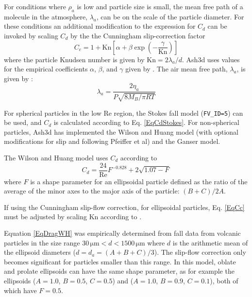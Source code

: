 For conditions where $\rho_a$
is low and particle size is small, the mean free path of a molecule in the
atmosphere, $\lambda_a$, can be on the scale of the particle diameter.  For these
conditions an additional modification to the expression for $C_d$ can
be invoked by scaling $C_d$ by the the Cunningham slip-correction factor
\begin{equation}
C_c = 1+\mathrm{Kn}\left[\alpha+\beta \exp{\left(-\frac{\gamma}{\mathrm{Kn}}\right)} \right]\label{EqCc}
\end{equation}
where the particle Knudsen number is given by $\mathrm{Kn}=2 \lambda_a / d$.
Ash3d uses values for the empirical coefficients $\alpha$, $\beta$, and
$\gamma$ given by \cite[p.407, Eq.9.34]{Seinfeld06}.
The air mean free path, $\lambda_a$, is given by \cite[p.399, Eq.9.6]{Seinfeld06}:
\begin{equation}
\lambda_a = \frac{2 \eta_a}{P\sqrt{8M_B/\pi R T}}\label{EqLambda}
\end{equation}

For spherical particles in the low $\mathrm{Re}$ region,
the Stokes fall model (\texttt{FV\_ID=5}) can be used, and $C_d$ is calculated
according to Eq. \ref{EqCdStokes}.  For non-spherical particles, Ash3d
has implemented the Wilson and Huang model (with optional modifications for
slip and following Pfeiffer et al) and the Ganser model.

The Wilson and Huang model uses $C_d$ according to
\begin{equation}
C_d = \frac{24}{\mathrm{Re}}F^{-0.828}+2 \sqrt{1.07-F}\label{EqDragWH}
\end{equation}
where $F$ is a shape parameter for an ellipsoidal particle
defined as the ratio of the average of the minor axes to the major axis of
the particle:  $(B+C)/2A$. 

If using the Cunningham slip-flow correction, for ellipsoidal particles,
Eq. \ref{EqCc} must be adjusted by scaling
$\mathrm{Kn}$ according to \cite[Table 1]{Dahneke73c}.

Equation \ref{EqDragWH} was empirically determined from fall data from volcanic
particles in the size range $30 \, \mathrm{\mu m} < d < 1500 \, \mathrm{\mu m}$
where $d$ is the
arithmetic mean of the ellipsoid diameters ($d=d_a=(A+B+C)/3$).  The slip-flow
correction only becomes significant for particles smaller than this range.
In this model, oblate and prolate ellipsoids can have the same shape parameter,
as for example the ellipsoids ($A=1.0$, $B=0.5$, $C=0.5$) and 
($A=1.0$, $B=0.9$, $C=0.1$), both of which have $F=0.5$.

